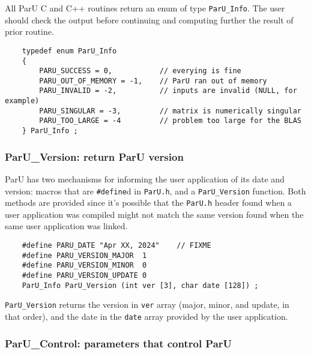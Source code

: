 \documentclass[12pt]{article}
\begin{document}
    All ParU C and C++ routines return an enum of type \verb'ParU_Info'.  The
    user should check the output before continuing and computing further the
    result of prior routine.

    {\footnotesize
    \begin{verbatim}
    typedef enum ParU_Info
    {
        PARU_SUCCESS = 0,           // everying is fine
        PARU_OUT_OF_MEMORY = -1,    // ParU ran out of memory
        PARU_INVALID = -2,          // inputs are invalid (NULL, for example)
        PARU_SINGULAR = -3,         // matrix is numerically singular
        PARU_TOO_LARGE = -4         // problem too large for the BLAS
    } ParU_Info ; \end{verbatim}}

\subsubsection{{\sf ParU\_Version}: return ParU version}

    ParU has two mechanisms for informing the user application of its date and
    version: macros that are \verb'#define'd in \verb'ParU.h', and a
    \verb'ParU_Version' function.  Both methods are provided since it's
    possible that the \verb'ParU.h' header found when a user application was
    compiled might not match the same version found when the same user
    application was linked.

    {\footnotesize
    \begin{verbatim}
    #define PARU_DATE "Apr XX, 2024"    // FIXME
    #define PARU_VERSION_MAJOR  1
    #define PARU_VERSION_MINOR  0
    #define PARU_VERSION_UPDATE 0
    ParU_Info ParU_Version (int ver [3], char date [128]) ; \end{verbatim}}

    \verb'ParU_Version' returns the version in \verb'ver' array (major, minor,
    and update, in that order), and the date in the \verb'date' array provided
    by the user application.

\subsubsection{{\sf ParU\_Control}: parameters that control ParU}
\end{document}
